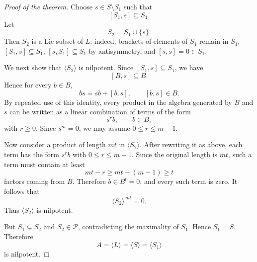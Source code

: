 \begin{proof}[Proof of the theorem]
    Choose $s\in S\setminus S_1$ such that
    \[
        [S_1,s]\subseteq S_1.
    \]
    Let
    \[
        S_2=S_1\cup\{s\}.
    \]
    Then $S_2$ is a Lie subset of $L$: indeed, brackets of elements of $S_1$ remain in $S_1$,
    \([S_1,s]\subseteq S_1\), \([s,S_1]\subseteq S_1\) by antisymmetry, and \([s,s]=0\in S_1\).

    We next show that $\langle S_2\rangle$ is nilpotent. Since $[S_1,s]\subseteq S_1$, we have
    \[
        [B,s]\subseteq B.
    \]
    Hence for every $b\in B$,
    \[
        bs=sb+[b,s],
        \qquad
        [b,s]\in B.
    \]
    By repeated use of this identity, every product in the algebra generated by $B$ and $s$ can be written
    as a linear combination of terms of the form
    \[
        s^r b,
        \qquad
        b\in B,
    \]
    with $r\ge 0$. Since $s^m=0$, we may assume $0\le r\le m-1$.

    Now consider a product of length $mt$ in $\langle S_2\rangle$. After rewriting it as above, each term
    has the form $s^r b$ with $0\le r\le m-1$. Since the original length is $mt$, such a term must contain
    at least
    \[
        mt-r\ge mt-(m-1)\ge t
    \]
    factors coming from $B$. Therefore $b\in B^t=0$, and every such term is zero. It follows that
    \[
        \langle S_2\rangle^{\,mt}=0.
    \]
    Thus $\langle S_2\rangle$ is nilpotent.

    But $S_1\subsetneq S_2$ and $S_2\in\mathcal P$, contradicting the maximality of $S_1$. Hence
    $S_1=S$. Therefore
    \[
        A=\langle L\rangle=\langle S\rangle=\langle S_1\rangle
    \]
    is nilpotent.
\end{proof}

